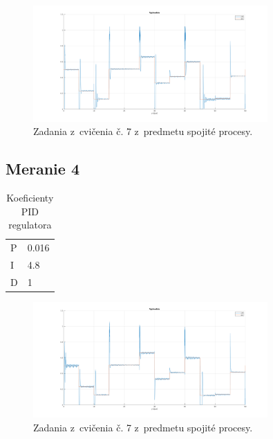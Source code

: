 \documentclass{article}
\begin{document}
\begin{figure}[!htbp]
	\begin{center}
		\includegraphics[width=0.8\textwidth]{./include/m3.png}
	\end{center}
	\caption{Zadania z~cvičenia č. 7 z~predmetu spojité procesy.}
	\label{fig:meranie3}
\end{figure}


\subsection{Meranie 4}
\label{sec:meranie4}
\begin{table}[!htbp]
	\caption{Koeficienty PID regulatora}
	\label{tab:t4}
	\begin{center}
		\begin{tabular}[c]{|l|l|}
			\hline

			P & 0.016 \\
			I & 4.8 \\
			D & 1 \\
			\hline
		\end{tabular}
	\end{center}
\end{table}

\begin{figure}[!htbp]
	\begin{center}
		\includegraphics[width=0.8\textwidth]{./include/m4.png}
	\end{center}
	\caption{Zadania z~cvičenia č. 7 z~predmetu spojité procesy.}
	\label{fig:meranie4}
\end{figure}
\end{document}
